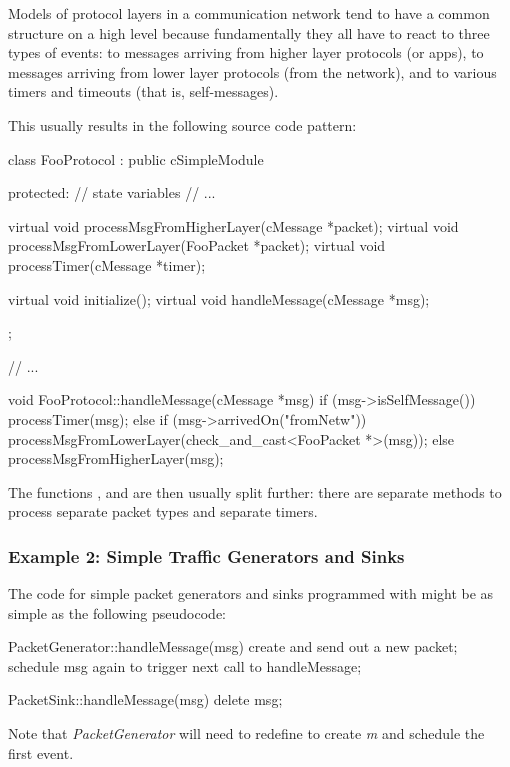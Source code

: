 Models of protocol layers in a communication network tend to have
a common structure on a high level because fundamentally they all have to react
to three types of events: to messages arriving from higher layer protocols
(or apps), to messages arriving from lower layer protocols (from the network),
and to various timers and timeouts (that is, self-messages).

This usually results in the following source code pattern:

\begin{cpp}
class FooProtocol : public cSimpleModule
{
  protected:
    // state variables
    // ...

    virtual void processMsgFromHigherLayer(cMessage *packet);
    virtual void processMsgFromLowerLayer(FooPacket *packet);
    virtual void processTimer(cMessage *timer);

    virtual void initialize();
    virtual void handleMessage(cMessage *msg);
};

// ...

void FooProtocol::handleMessage(cMessage *msg)
{
    if (msg->isSelfMessage())
        processTimer(msg);
    else if (msg->arrivedOn("fromNetw"))
        processMsgFromLowerLayer(check_and_cast<FooPacket *>(msg));
    else
        processMsgFromHigherLayer(msg);
}
\end{cpp}

The functions , 
and  are then usually split further: there are separate
methods to process separate packet types and separate timers.


\subsubsection{Example 2: Simple Traffic Generators and Sinks}


The code for simple packet generators and sinks programmed with  might
be as simple as the following pseudocode:

\begin{cpp}
PacketGenerator::handleMessage(msg)
{
    create and send out a new packet;
    schedule msg again to trigger next call to handleMessage;
}

PacketSink::handleMessage(msg)
{
    delete msg;
}
\end{cpp}

Note that \textit{PacketGenerator} will need to redefine 
to create \textit{m} and schedule the first event.

